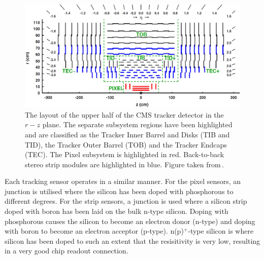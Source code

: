 \begin{figure}[htpb]
	\centering
	\includegraphics[width=\textwidth]{Figures/CMSTracker2.jpg}
	\caption[The layout of the upper half of the CMS tracker detector in the $r-z$ plane. The separate subsystem regions have been highlighted and are classified as the Tracker Inner Barrel and Disks (TIB and TID), the Tracker Outer Barrel (TOB) and the Tracker Endcaps (TEC). The Pixel subsystem is highlighted in red. Back-to-back stereo strip modules are highlighted in blue.]{The layout of the upper half of the CMS tracker detector in the $r-z$ plane. The separate subsystem regions have been highlighted and are classified as the Tracker Inner Barrel and Disks (TIB and TID), the Tracker Outer Barrel (TOB) and the Tracker Endcaps (TEC). The Pixel subsystem is highlighted in red. Back-to-back stereo strip modules are highlighted in blue. Figure taken from\,\cite{CMSTrackerPerformance}.}
	\label{fig:CMSTracker}
\end{figure}

Each tracking sensor operates in a similar manner.
For the pixel sensors, an \nnjunc{} junction is utilised where the silicon has been doped with phosphorous to different degrees. 
For the strip sensors, a \pnjunc{} junction is used where a silicon strip doped with boron has been laid on the bulk n-type silicon.
Doping with phosphorous causes the silicon to become an electron donor (n-type) and doping with boron to become an electron acceptor (p-type).
n(p)$^{+}$-type silicon is where silicon has been doped to such an extent that the resisitivity is very low, resulting in a very good chip readout connection.

